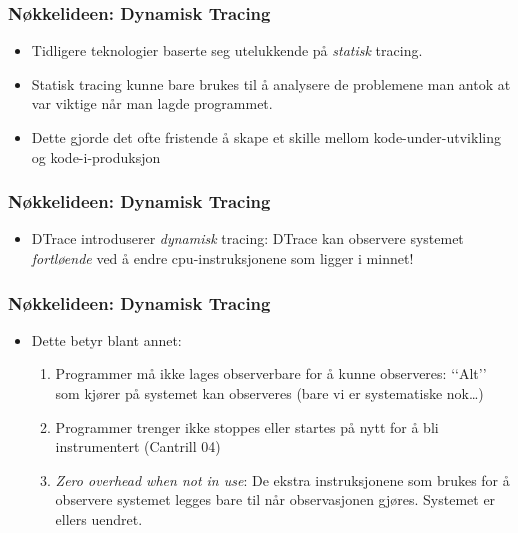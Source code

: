 \documentclass{beamer}
\begin{document}
\begin{frame}
    \frametitle{Nøkkelideen: Dynamisk Tracing}
    \begin{itemize}
        \item Tidligere teknologier baserte seg utelukkende på \emph{statisk} tracing.

        \item Statisk tracing kunne bare brukes til å analysere de problemene man
            antok at var viktige når man lagde programmet.

        \item Dette gjorde det ofte fristende å skape et skille mellom
              kode-under-utvikling og kode-i-produksjon
    \end{itemize}

\end{frame}

\begin{frame}
    \frametitle{Nøkkelideen: Dynamisk Tracing}
    \begin{itemize}

          \item DTrace introduserer \emph{dynamisk} tracing: DTrace kan
              observere systemet \emph{fortløende} ved å endre
         cpu-instruksjonene som ligger i minnet!

         \end{itemize}
 \end{frame}

 \begin{frame}
    \frametitle{Nøkkelideen: Dynamisk Tracing}
 \begin{itemize}

     \item Dette betyr blant annet:

         \begin{enumerate}
             \item Programmer må ikke lages observerbare for å kunne observeres:
            ‘‘Alt’’ som kjører på systemet kan observeres (bare vi er
            systematiske nok…)

        \item Programmer trenger ikke stoppes eller startes på nytt for å bli
            instrumentert (Cantrill 04)

        \item \emph{Zero overhead when not in use}: De ekstra instruksjonene som
            brukes for å observere systemet legges bare til når observasjonen
            gjøres. Systemet er ellers uendret.
         \end{enumerate}
 \end{itemize}
 \end{frame}
\end{document}
